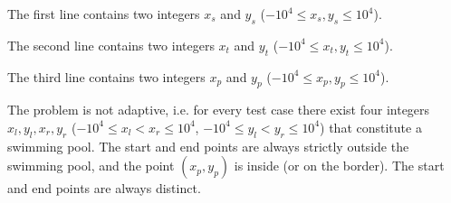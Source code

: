 
The first line contains two integers $x_s$ and $y_s$ ($-10^4 \leq x_s, y_s \leq 10^4$).

The second line contains two integers $x_t$ and $y_t$ ($-10^4 \leq x_t, y_t \leq 10^4$).

The third line contains two integers $x_p$ and $y_p$ ($-10^4 \leq x_p, y_p \leq 10^4$).

The problem is not adaptive, i.e. for every test case there exist four integers 
$x_l, y_l, x_r, y_r$ ($-10^4 \leq x_l < x_r \leq 10^4$, $-10^4 \leq y_l < y_r \leq 10^4$) 
that constitute a swimming pool. 
The start and end points are always strictly outside the swimming pool, and the point $(x_p,y_p)$
is inside (or on the border). The start and end points are always distinct.


